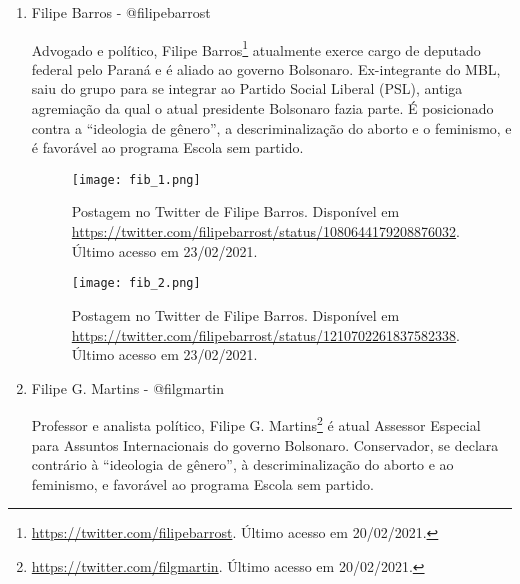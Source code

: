 \documentclass[
	12pt,				%
	openright,			%
	twoside,			%
	a4paper,			%
	english,			%
	brazil				%
	]{abntex2}
\begin{document}
\begin{anexosenv}
\begin{enumerate}
 \begin{figure}[!htbp]
    \centering
    \texttt{[image: fh\_2.png]}
    \caption{Postagem no Twitter de Fernando Holiday. Disponível em \url{https://twitter.com/FernandoHoliday/status/918265588815945728}. Último acesso em 23/02/2021.}
 \end{figure}
 
 \begin{figure}[!htbp]
    \centering
    \texttt{[image: fh\_3.png]}
    \caption{Postagem no Twitter de Fernando Holiday. Disponível em \url{https://twitter.com/FernandoHoliday/status/839557274213486595}. Último acesso em 23/02/2021.}
 \end{figure}
  
  \newpage
  
 \item Filipe Barros - @filipebarrost
 
 Advogado e político, Filipe Barros\footnote{\url{https://twitter.com/filipebarrost}. Último acesso em 20/02/2021.} atualmente exerce cargo de deputado federal pelo Paraná e é aliado ao governo Bolsonaro. Ex-integrante do MBL, saiu do grupo para se integrar ao Partido Social Liberal (PSL), antiga agremiação da qual o atual presidente Bolsonaro fazia parte. É posicionado contra a ``ideologia de gênero'', a descriminalização do aborto e o feminismo, e é favorável ao programa Escola sem partido. 
 
 \begin{figure}[!htbp]
    \centering
    \texttt{[image: fib\_1.png]}
    \caption{Postagem no Twitter de Filipe Barros. Disponível em \url{https://twitter.com/filipebarrost/status/1080644179208876032}. Último acesso em 23/02/2021.}
 \end{figure}
 
 \begin{figure}[!htbp]
    \centering
    \texttt{[image: fib\_2.png]}
    \caption{Postagem no Twitter de Filipe Barros. Disponível em \url{https://twitter.com/filipebarrost/status/1210702261837582338}. Último acesso em 23/02/2021.}
 \end{figure}
  
 \item Filipe G. Martins - @filgmartin
 
 Professor e analista político, Filipe G. Martins\footnote{\url{https://twitter.com/filgmartin}. Último acesso em 20/02/2021.} é atual Assessor Especial para Assuntos Internacionais do governo Bolsonaro. Conservador, se declara contrário à ``ideologia de gênero'', à descriminalização do aborto e ao feminismo, e favorável ao programa Escola sem partido.
 

\end{enumerate}
\end{anexosenv}
\end{document}
